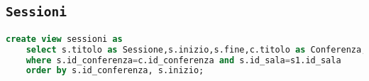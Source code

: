 \subsection{\texttt{Sessioni}}
\begin{lstlisting}[language=SQL,style=mystyle]
	create view sessioni as
	select s.titolo as Sessione,s.inizio,s.fine,c.titolo as Conferenza,s1.nome from sessione s, conferenza c,sala s1
	where s.id_conferenza=c.id_conferenza and s.id_sala=s1.id_sala
	order by s.id_conferenza, s.inizio;
\end{lstlisting}